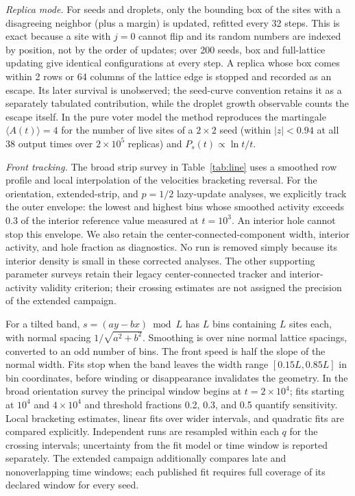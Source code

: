 \textit{Replica mode.} For seeds and droplets, only the bounding box of the sites with a
disagreeing neighbor (plus a margin) is updated, refitted every 32 steps. This is exact because a
site with $j = 0$ cannot flip and its random numbers are indexed by position, not by the order
of updates; over 200 seeds, box and full-lattice updating give identical configurations at
every step. A replica whose box comes within 2 rows or 64 columns of the lattice edge is stopped
and recorded as an escape. Its later survival is unobserved; the
seed-curve convention retains it as a separately tabulated contribution,
while the droplet growth observable counts the escape itself. In the pure voter model the method reproduces the martingale
$\langle A(t)\rangle = 4$ for the number of live sites of a $2\times2$ seed (within $|z|<0.94$
at all 38 output times over $2\times10^5$ replicas) and $P_s(t)\propto\ln t/t$.

\textit{Front tracking.} The broad strip survey in Table~\ref{tab:line}
uses a smoothed row profile and local interpolation of the velocities bracketing
reversal. For the orientation, extended-strip, and $p=1/2$ lazy-update
analyses, we explicitly track
the outer envelope: the lowest and highest bins whose smoothed activity exceeds
$0.3$ of the interior reference value measured at $t=10^3$. An interior hole
cannot stop this envelope. We also retain the center-connected-component width,
interior activity, and hole fraction as diagnostics. No run is removed simply
because its interior density is small in these corrected analyses.
The other supporting parameter surveys retain their legacy center-connected
tracker and interior-activity validity criterion; their crossing estimates
are not assigned the precision of the extended campaign.

For a tilted band, $s=(ay-bx)\bmod L$ has $L$ bins containing $L$ sites each,
with normal spacing $1/\sqrt{a^2+b^2}$. Smoothing is over nine normal lattice
spacings, converted to an odd number of bins. The front speed is half the slope
of the normal width. Fits stop when the band leaves the width range
$[0.15L,0.85L]$ in bin coordinates, before winding or disappearance invalidates
the geometry. In the broad orientation survey the principal window begins at
$t=2\times10^4$; fits starting at $10^4$ and $4\times10^4$ and threshold
fractions 0.2, 0.3, and 0.5 quantify sensitivity. Local bracketing estimates,
linear fits over wider intervals, and quadratic fits are compared explicitly.
Independent runs are resampled within each $q$ for the crossing intervals;
uncertainty from the fit model or time window is reported separately. The
extended campaign additionally compares late and nonoverlapping time windows;
each published fit requires full coverage of its declared window for every seed.

